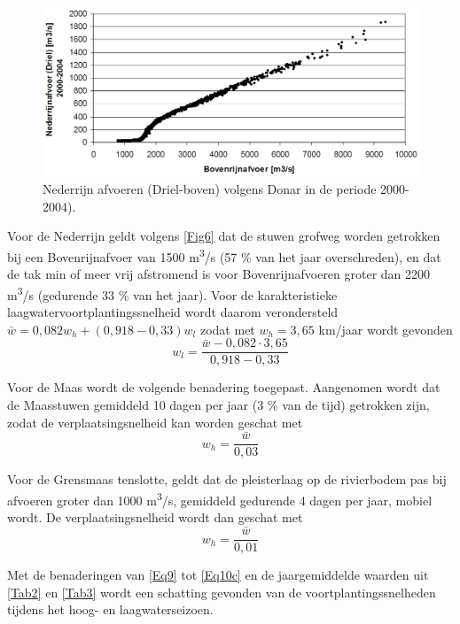 \begin{figure}
\includegraphics[width=\columnwidth]{figures/Fig6.png}
\caption{Nederrijn afvoeren (Driel-boven) volgens Donar in de periode 2000-2004).}
\label{Fig6}
\end{figure}

Voor de Nederrijn geldt volgens \autoref{Fig6} dat de stuwen grofweg worden getrokken bij een Bovenrijnafvoer van 1500 m\textsuperscript{3}/s (57 \% van het jaar overschreden), en dat de tak min of meer vrij afstromend is voor Bovenrijnafvoeren groter dan 2200 m\textsuperscript{3}/s (gedurende 33 \% van het jaar). Voor de karakteristieke laagwatervoortplantingssnelheid wordt daarom verondersteld $\bar{w} = 0,082 w_h + (0,918 - 0,33) w_l$ zodat met $w_h = 3,65$ km/jaar wordt gevonden
%
\begin{equation}
w_l = \frac{\bar{w} - 0,082 \cdot 3,65}{0,918 - 0,33}
\label{Eq10a}
\end{equation}

Voor de Maas wordt de volgende benadering toegepast.
Aangenomen wordt dat de Maasstuwen gemiddeld 10 dagen per jaar (3 \% van de tijd) getrokken zijn, zodat de verplaatsingsnelheid kan worden geschat met
%
\begin{equation}
w_h = \frac{\bar{w}}{0,03}
\label{10b}
\end{equation}


Voor de Grensmaas tenslotte, geldt dat de pleisterlaag op de rivierbodem pas bij afvoeren groter dan 1000 m\textsuperscript{3}/s, gemiddeld gedurende 4 dagen per jaar, mobiel wordt.
De verplaatsingsnelheid wordt dan geschat met
%
\begin{equation}
w_h = \frac{\bar{w}}{0,01}
\label{Eq10c}
\end{equation}

Met de benaderingen van \autoref{Eq9} tot \autoref{Eq10c} en de jaargemiddelde waarden uit \autoref{Tab2} en \autoref{Tab3} wordt een schatting gevonden van de voortplantingssnelheden tijdens het hoog- en laagwaterseizoen.

